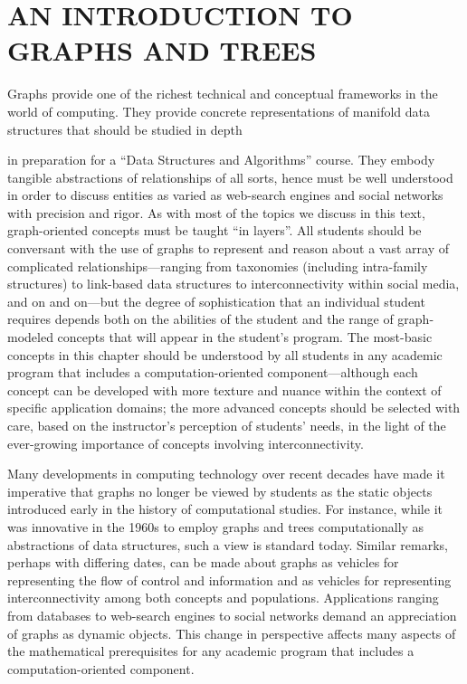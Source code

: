 
\chapter{AN INTRODUCTION TO GRAPHS AND TREES}
\label{Ch:Graphs-Trees}

Graphs provide one of the richest technical and conceptual frameworks
in the world of computing.  They provide concrete representations of
manifold data structures that should be studied in depth
in preparation for a ``Data Structures and Algorithms'' course.  They
embody tangible abstractions of relationships of all sorts, hence must
be well understood in order to discuss entities as varied as
web-search engines and social networks with precision and rigor.  As
with most of the topics we discuss in this text, graph-oriented
concepts must be taught ``in layers''.  All students should be
conversant with the use of graphs to represent and reason about a vast
array of complicated relationships---ranging from taxonomies
(including intra-family structures) to link-based data structures to
interconnectivity within social media, and on and on---but the degree
of sophistication that an individual student requires depends both on
the abilities of the student and the range of graph-modeled concepts
that will appear in the student's program.  The most-basic concepts in
this chapter should be understood by all students in any academic
program that includes a computation-oriented component---although each
concept can be developed with more texture and nuance within the
context of specific application domains; the more advanced concepts
should be selected with care, based on the instructor's perception of
students' needs, in the light of the ever-growing importance of
concepts involving interconnectivity.

Many developments in computing technology over recent decades have
made it imperative that graphs no longer be viewed by students as the
static objects introduced early in the history of computational
studies.  For instance, while it was innovative in the 1960s to employ
graphs and trees computationally as abstractions of data structures, such a view
is standard today.  Similar remarks, perhaps with differing dates, can
be made about graphs as vehicles for representing the flow of control
and information and as vehicles for representing interconnectivity
among both concepts and populations.  Applications ranging from
databases to web-search engines to social networks demand an
appreciation of graphs as dynamic objects.  This change in perspective
affects many aspects of the mathematical prerequisites for any
academic program that includes a computation-oriented component.

